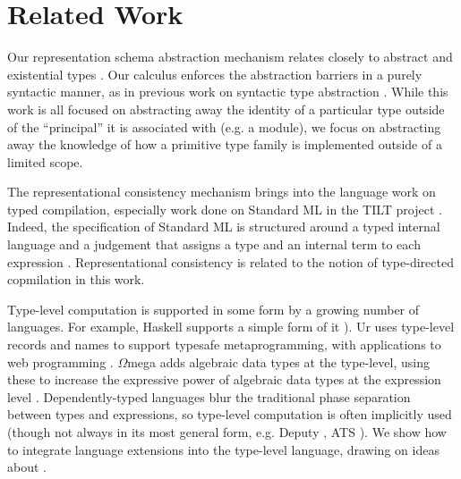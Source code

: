 \documentclass[9pt,preprint]{sigplanconf}
\begin{document}
\section{Related Work}\label{related-work}
Our representation schema abstraction mechanism relates closely to abstract and existential types \cite{pfpl,atpl}. Our calculus enforces the abstraction barriers  in a purely syntactic manner, as in previous work on syntactic type abstraction \cite{syntypeabs}. While this work is all focused on abstracting away the identity of a particular type outside of the ``principal'' it is associated with (e.g. a module), we focus on abstracting away the knowledge of how a primitive type family is implemented outside of a limited scope.

The representational consistency mechanism brings into the language work on typed compilation, especially work done on Standard ML in the TILT project \cite{tilt}. Indeed, the specification of Standard ML is structured around a typed internal language and a judgement that assigns a type and an internal term to each expression \cite{smlstd}. Representational consistency is related to the notion of type-directed copmilation in this work.

Type-level computation is supported in some form by a growing number of languages. For example, Haskell supports a simple form of it \cite{Chakravarty:2005:ATC}). Ur uses type-level records and names to support typesafe metaprogramming, with applications to web programming \cite{conf/pldi/Chlipala10}. $\Omega$mega adds algebraic data types at the type-level, using these to increase the expressive power of algebraic data types at the expression level \cite{conf/cefp/SheardL07}. Dependently-typed languages blur the traditional phase separation between types and expressions, so type-level computation is often implicitly used (though not always in its most general form, e.g. Deputy \cite{conf/icfp/ChenX05}, ATS \cite{conf/esop/ConditHAGN07}). We show how to integrate language extensions into the type-level language, drawing on ideas about \cite{activelibraries}.

\end{document}
